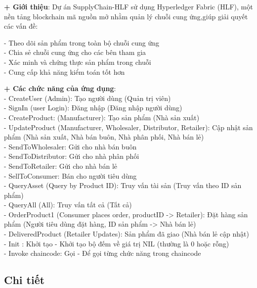 \documentclass[a4paper,12pt]{article}
\begin{document}
\textbf{+ Giới thiệu}: Dự án SupplyChain-HLF sử dụng Hyperledger Fabric (HLF), một nền tảng blockchain mã nguồn mở nhằm quản lý chuỗi cung ứng,giúp giải quyết các vấn đề:
\begin{itemize}
- Theo dõi sản phẩm trong toàn bộ chuỗi cung ứng\\
- Chia sẻ chuỗi cung ứng cho các bên tham gia\\
- Xác minh và chứng thực sản phẩm trong chuỗi\\
- Cung cấp khả năng kiểm toán tốt hơn\\
\end{itemize}
\textbf{+ Các chức năng của ứng dụng}:\\
- CreateUser (Admin): Tạo người dùng (Quản trị viên)\\
- SignIn (user Login): Đăng nhập (Đăng nhập người dùng)\\
- CreateProduct: (Manufacturer): Tạo sản phẩm (Nhà sản xuất)\\
- UpdateProduct (Manufacturer, Wholesaler, Distributor, Retailer): Cập nhật sản phẩm (Nhà sản xuất, Nhà bán buôn, Nhà phân phối, Nhà bán lẻ)\\
- SendToWholesaler: Gửi cho nhà bán buôn\\
- SendToDistributor: Gửi cho nhà phân phối\\
- SendToRetailer: Gửi cho nhà bán lẻ\\
- SellToConsumer: Bán cho người tiêu dùng\\
- QueryAsset (Query by Product ID): Truy vấn tài sản (Truy vấn theo ID sản phẩm)\\
- QueryAll (All): Truy vấn tất cả (Tất cả)\\
- OrderProduct1 (Consumer places order, productID -> Retailer): Đặt hàng sản phẩm (Người tiêu dùng đặt hàng, ID sản phẩm -> Nhà bán lẻ)   \\
- DeliveredProduct (Retailer Updates): Sản phẩm đã giao (Nhà bán lẻ cập nhật)\\
- Init : Khởi tạo - Khởi tạo bộ đếm về giá trị NIL (thường là 0 hoặc rỗng)\\
- Invoke chaincode: Gọi - Để gọi từng chức năng trong chaincode\\
\begin{itemize}

\end{itemize}

{\color{red} \subsection{Chi tiết}}
\end{document}
